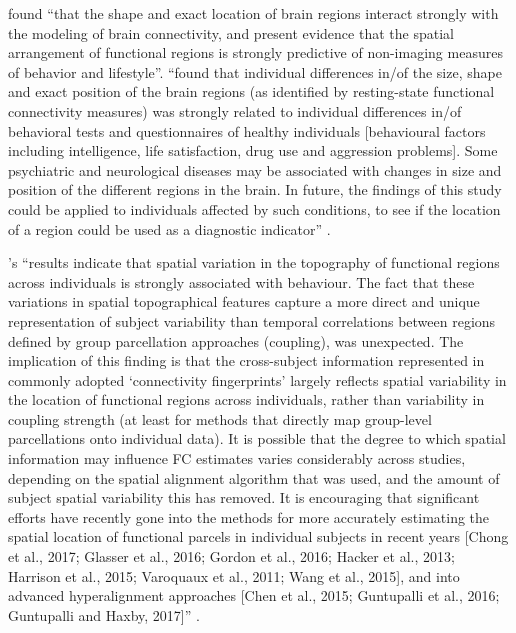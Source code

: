 %
\citet{bijsterbosch2018relationship} found ``that the shape and exact location
of brain regions interact strongly with the modeling of brain connectivity, and
present evidence that the spatial arrangement of functional regions is strongly
predictive of non-imaging measures of behavior and lifestyle''.
%
\citet{bijsterbosch2018relationship} ``found that individual
differences in/of the size, shape and exact position of the brain regions (as
identified by resting-state functional connectivity measures) was strongly
related to individual differences in/of behavioral tests and questionnaires of
healthy individuals [behavioural factors including intelligence, life
satisfaction, drug use and aggression problems].
%
Some psychiatric and neurological diseases may be associated with changes in
size and position of the different regions in the brain.
%
In future, the findings of this study could be applied to individuals affected
by such conditions, to see if the location of a region could be used as a
diagnostic indicator'' \citep{bijsterbosch2018relationship}.


\citep{bijsterbosch2018relationship}'s ``results indicate that spatial variation
in the topography of functional regions across individuals is strongly
associated with behaviour.
%
The fact that these variations in spatial topographical features capture a more
direct and unique representation of subject variability than temporal
correlations between regions defined by group parcellation approaches
(coupling), was unexpected.
%
The implication of this finding is that the cross-subject information
represented in commonly adopted ‘connectivity fingerprints’ largely reflects
spatial variability in the location of functional regions across individuals,
rather than variability in coupling strength (at least for methods that directly
map group-level parcellations onto individual data).
%
It is possible that the degree to which spatial information may influence FC
estimates varies considerably across studies, depending on the spatial alignment
algorithm that was used, and the amount of subject spatial variability this has
removed.
%
It is encouraging that significant efforts have recently gone into the methods
for more accurately estimating the spatial location of functional parcels in
individual subjects in recent years [Chong et al., 2017; Glasser et al., 2016;
Gordon et al., 2016; Hacker et al., 2013; Harrison et al., 2015; Varoquaux et
al., 2011; Wang et al., 2015], and into advanced hyperalignment approaches [Chen
et al., 2015; Guntupalli et al., 2016; Guntupalli and Haxby, 2017]''
\citep{bijsterbosch2018relationship}.



